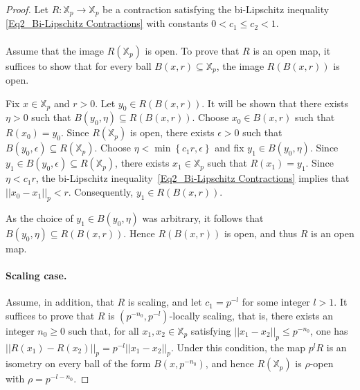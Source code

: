 \documentclass[a4paper, 12pt]{article}
\theoremstyle{definition}
\begin{document}
	\begin{proof}
		Let $R : \mathbb{X}_{p} \to \mathbb{X}_{p}$ be a contraction satisfying the bi-Lipschitz inequality \eqref{Eq2_Bi-Lipschitz Contractions} with constants $0  < c_{1} \le c_{2}  < 1$. 
		
		\paragraph{} 
		
		Assume that the image $R \left(  \mathbb{X}_{p}  \right) $ is open. To prove that $R$ is an open map, it suffices to show that for every ball $B \left(  x, r  \right)  \subseteq \mathbb{X}_{p}$, the image $R \left(  B \left(  x, r  \right)   \right) $ is open. 
		
		
		
		Fix $x \in \mathbb{X}_{p}$ and $r  > 0$.  Let $y_{0} \in R \left(  B \left(  x, r  \right)   \right) $. 
		It will be shown that there exists $ \eta  > 0$ such that $B \left(  y_{0},  \eta  \right)  \subseteq R \left(  B \left(  x, r  \right)   \right) $. 
		Choose $x_{0} \in B \left(  x, r  \right) $ such that $R \left(  x_{0}  \right)  = y_{0}$. Since $R \left(  \mathbb{X}_{p}  \right) $ is open, there exists $ \epsilon  > 0$ such that $B \left(  y_{0},  \epsilon  \right)  \subseteq R \left(  \mathbb{X}_{p}  \right) $. 
		Choose $ \eta  < \min \left\{  c_{1} r,    \epsilon  \right\} $ and fix $y_{1} \in B \left(  y_{0},  \eta  \right) $. Since $y_{1} \in B \left(  y_{0},  \epsilon  \right)  \subseteq R \left(  \mathbb{X}_{p}  \right) $, there exists $x_{1} \in \mathbb{X}_{p}$ such that $R \left(  x_{1}  \right)  = y_{1}$. Since $ \eta < c_{1} r$, the bi-Lipschitz inequality~\eqref{Eq2_Bi-Lipschitz Contractions} implies that $ \left| \left|  x_{0} - x_{1}  \right|  \right|_{p} < r$. Consequently, $y_{1} \in R \left(  B \left(  x, r  \right)   \right) $. 
		
		As the choice of $y_{1} \in B \left(  y_{0},  \eta  \right) $ was arbitrary, it follows that $B \left(  y_{0},  \eta  \right)  \subseteq R \left(  B \left(  x, r  \right)   \right) $. Hence $R \left(  B \left(  x, r  \right)   \right) $ is open, and thus $R$ is an open map. 
		
		
		
		
		\paragraph{Scaling case.}
		Assume, in addition, that $R$ is scaling, and let $c_{1} = p^{-l}$ for some integer $l > 1$. It suffices to prove 
		that $R$ is $ \left(  p^{-n_{0}}, p^{-l}  \right) $-locally scaling, that is, there exists an integer $n_{0} \ge 0$ such that, for all $x_{1},x_{2} \in \mathbb{X}_{p}$ satisfying  $  \left| \left|  x_{1}-x_{2}  \right|  \right|_{p}  \le  p^{-n_{0}}$, one has $  \left| \left|  R  \left(  x_{1}  \right)  - R \left(  x_{2}  \right)  \right|  \right|_{p} = p^{-l}  \left| \left|  x_{1} - x_{2}  \right|  \right|_{p}$.  
		Under this condition, the map $p^{l}R$ is an isometry on every ball of the form $B \left(  x,p^{-n_{0}}  \right) $, and hence $R \left(  \mathbb{X}_{p}  \right) $ is $\rho$-open with $\rho = p^{-l-n_{0}}$.
		

\end{proof}
\end{document}
